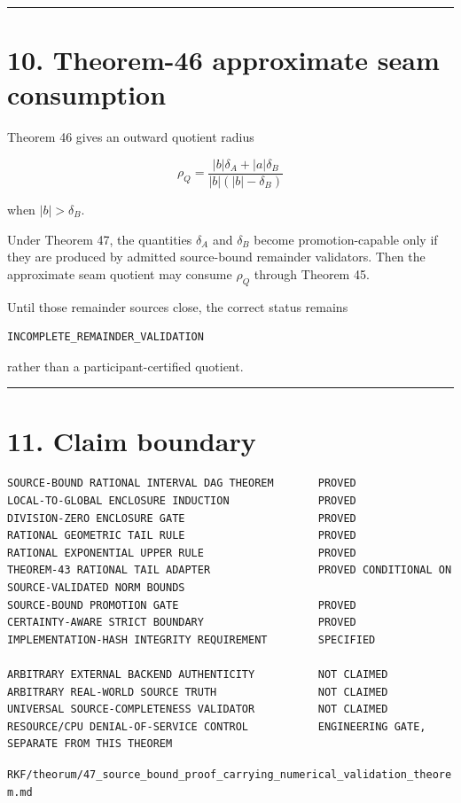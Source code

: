 \begin{center}\rule{0.5\linewidth}{0.5pt}\end{center}

\hypertarget{theorem-46-approximate-seam-consumption}{%
\section{10. Theorem-46 approximate seam consumption}\label{theorem-46-approximate-seam-consumption}}

Theorem 46 gives an outward quotient radius

\[
\rho_Q
=
\frac{|b|\delta_A+|a|\delta_B}
{|b|(|b|-\delta_B)}
\]

when \(|b|>\delta_B\).

Under Theorem 47, the quantities \(\delta_A\) and \(\delta_B\) become promotion-capable only if they are produced by admitted source-bound remainder validators. Then the approximate seam quotient may consume \(\rho_Q\) through Theorem 45.

Until those remainder sources close, the correct status remains

\begin{verbatim}
INCOMPLETE_REMAINDER_VALIDATION
\end{verbatim}

rather than a participant-certified quotient.

\begin{center}\rule{0.5\linewidth}{0.5pt}\end{center}

\hypertarget{claim-boundary}{%
\section{11. Claim boundary}\label{claim-boundary}}

\begin{verbatim}
SOURCE-BOUND RATIONAL INTERVAL DAG THEOREM       PROVED
LOCAL-TO-GLOBAL ENCLOSURE INDUCTION              PROVED
DIVISION-ZERO ENCLOSURE GATE                     PROVED
RATIONAL GEOMETRIC TAIL RULE                     PROVED
RATIONAL EXPONENTIAL UPPER RULE                  PROVED
THEOREM-43 RATIONAL TAIL ADAPTER                 PROVED CONDITIONAL ON SOURCE-VALIDATED NORM BOUNDS
SOURCE-BOUND PROMOTION GATE                      PROVED
CERTAINTY-AWARE STRICT BOUNDARY                  PROVED
IMPLEMENTATION-HASH INTEGRITY REQUIREMENT        SPECIFIED

ARBITRARY EXTERNAL BACKEND AUTHENTICITY          NOT CLAIMED
ARBITRARY REAL-WORLD SOURCE TRUTH                NOT CLAIMED
UNIVERSAL SOURCE-COMPLETENESS VALIDATOR          NOT CLAIMED
RESOURCE/CPU DENIAL-OF-SERVICE CONTROL           ENGINEERING GATE, SEPARATE FROM THIS THEOREM
\end{verbatim}

\begin{flushright}\small\texttt{RKF/theorum/47\_source\_bound\_proof\_carrying\_numerical\_validation\_theorem.md}\end{flushright}
